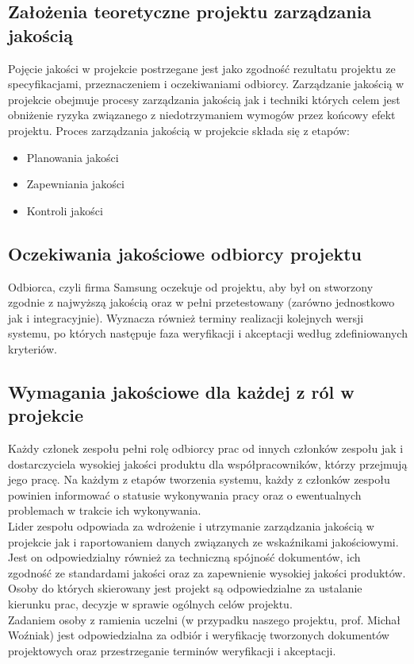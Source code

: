 \documentclass{article}
\begin{document}
\subsection{Założenia teoretyczne projektu zarządzania jakością}
Pojęcie jakości w projekcie postrzegane jest jako zgodność rezultatu projektu ze
specyfikacjami, przeznaczeniem i oczekiwaniami odbiorcy.
Zarządzanie jakością w projekcie obejmuje procesy zarządzania jakością jak i techniki których celem jest obniżenie ryzyka związanego z niedotrzymaniem wymogów przez końcowy efekt projektu. Proces zarządzania jakością w projekcie składa się z etapów:
\begin{itemize}
\item Planowania jakości
\item Zapewniania jakości
\item Kontroli jakości
\end{itemize}

\subsection{Oczekiwania jakościowe odbiorcy projektu}

Odbiorca, czyli firma Samsung oczekuje od projektu, aby był on stworzony zgodnie z najwyższą jakością oraz w pełni przetestowany (zarówno jednostkowo jak i integracyjnie). Wyznacza również terminy realizacji kolejnych wersji systemu, po których następuje faza weryfikacji i akceptacji według zdefiniowanych kryteriów.

\subsection{Wymagania jakościowe dla każdej z ról w projekcie}
    
Każdy członek zespołu pełni rolę odbiorcy prac od innych członków zespołu jak i dostarczyciela wysokiej jakości produktu dla współpracowników, którzy przejmują jego pracę. Na każdym z etapów tworzenia systemu, każdy z członków zespołu powinien informować o statusie wykonywania pracy oraz o ewentualnych problemach w trakcie ich wykonywania.\\
Lider zespołu odpowiada za wdrożenie i utrzymanie zarządzania jakością w projekcie jak i raportowaniem danych związanych ze wskaźnikami jakościowymi. Jest on odpowiedzialny również za techniczną spójność dokumentów, ich zgodność ze standardami jakości oraz za zapewnienie wysokiej jakości produktów.\\
Osoby do których skierowany jest projekt są odpowiedzialne za ustalanie kierunku prac, decyzje w sprawie ogólnych celów projektu.\\
Zadaniem osoby z ramienia uczelni (w przypadku naszego projektu, prof. Michał Woźniak) jest odpowiedzialna za odbiór i weryfikację tworzonych dokumentów projektowych oraz przestrzeganie terminów weryfikacji i akceptacji.
\end{document}
